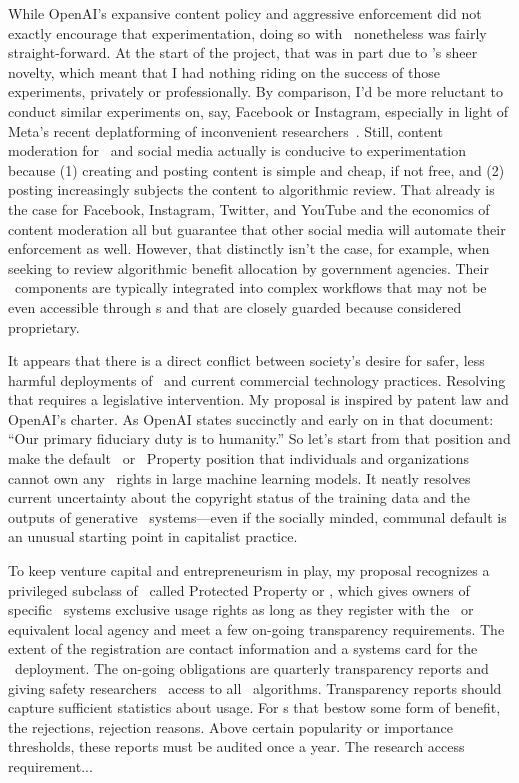 While OpenAI's expansive content policy and aggressive enforcement did not
exactly encourage that experimentation, doing so with \DALLE\ nonetheless was
fairly straight-forward. At the start of the project, that was in part due to
\DALLE's sheer novelty, which meant that I had nothing riding on the success of
those experiments, privately or professionally. By comparison, I'd be more
reluctant to conduct similar experiments on, say, Facebook or Instagram,
especially in light of Meta's recent deplatforming of inconvenient
researchers~\cite{EdelsonMcCoy2021a}. Still, content moderation for \DALLE\ and
social media actually is conducive to experimentation because (1) creating and
posting content is simple and cheap, if not free, and (2) posting increasingly
subjects the content to algorithmic review. That already is the case for
Facebook, Instagram, Twitter, and YouTube and the economics of content
moderation all but guarantee that other social media will automate their
enforcement as well. However, that distinctly isn't the case, for example, when
seeking to review algorithmic benefit allocation by government agencies. Their
\AI\ components are typically integrated into complex workflows that may not be
even accessible through \API{}s and that are closely guarded because considered
proprietary.

It appears that there is a direct conflict between society's desire for safer,
less harmful deployments of \AI\ and current commercial technology practices.
Resolving that requires a legislative intervention. My proposal is inspired by
patent law and OpenAI's charter. As OpenAI states succinctly and early on in
that document: ``Our primary fiduciary duty is to humanity.'' So let's start
from that position and make the default \AIP\ or \AI\ Property position that
individuals and organizations cannot own any \IP\ rights in large machine
learning models. It neatly resolves current uncertainty about the copyright
status of the training data and the outputs of generative \AI\ systems---even if
the socially minded, communal default is an unusual starting point in capitalist
practice.

To keep venture capital and entrepreneurism in play, my proposal recognizes a
privileged subclass of \AIP\ called \AI Protected Property or \AIPP, which gives
owners of specific \AI\ systems exclusive usage rights as long as they register
with the \USPTO\ or equivalent local agency and meet a few on-going transparency
requirements. The extent of the registration are contact information and a
systems card for the \AIPP\ deployment. The on-going obligations are quarterly
transparency reports and giving safety researchers \API\ access to all \AI\
algorithms. Transparency reports should capture sufficient statistics about
usage. For \AI{}s that bestow some form of benefit, the rejections, rejection
reasons. Above certain popularity or importance thresholds, these reports
must be audited once a year. The research access requirement...

